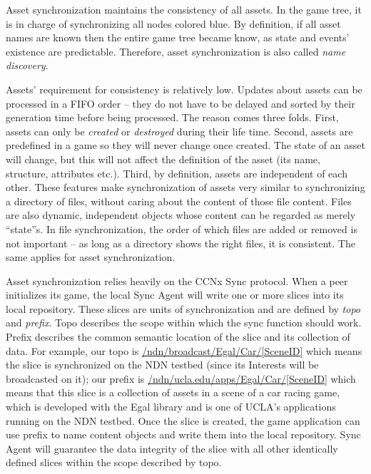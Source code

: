 \documentclass{sigchi}
\begin{document}
Asset synchronization maintains the consistency of all assets. In the game tree, it is in charge of synchronizing all nodes colored blue. By definition, if all asset names are known then the entire game tree became know, as state and events' existence are predictable. Therefore, asset synchronization is also called \emph{name discovery}.

Assets' requirement for consistency is relatively low. Updates about assets can be processed in a FIFO order -- they do not have to be delayed and sorted by their generation time before being processed. The reason comes three folds. First, assets can only be \emph{created} or \emph{destroyed} during their life time. Second, assets are predefined in a game so they will never change once created. The state of an asset will change, but this will not affect the definition of the asset (its name, structure, attributes etc.). Third, by definition, assets are independent of each other. These features make synchronization of assets very similar to synchronizing a directory of files, without caring about the content of those file content.  Files are also dynamic, independent objects whose content can be regarded as merely ``state''s. In file synchronization, the order of which files are added or removed is not important -- as long as a directory shows the right files, it is consistent. The same applies for asset synchronization.

Asset synchronization relies heavily on the CCNx Sync protocol. When a peer initializes its game, the local Sync Agent will write one or more slices into its local repository. These slices are units of synchronization and are defined by \emph{topo} and \emph{prefix}. Topo describes the scope within which the sync function should work. Prefix describes the common semantic location of the slice and its collection of data. For example, our topo is \url{/ndn/broadcast/Egal/Car/[SceneID]} which means the slice is synchronized on the NDN testbed (since its Interests will be broadcasted on it); our prefix is \url{/ndn/ucla.edu/apps/Egal/Car/[SceneID]} which means that this slice is a collection of assets in a scene of a car racing game, which is developed with the Egal library and is one of UCLA's applications running on the NDN testbed. Once the slice is created, the game application can use prefix to name content objects and write them into the local repository. Sync Agent will guarantee the data integrity of the slice with all other identically defined slices within the scope described by topo.
\end{document}
